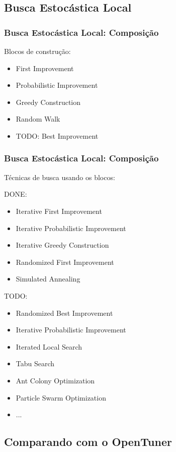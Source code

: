 \documentclass[10pt, compress]{beamer}
\begin{document}
\subsection{Busca Estocástica Local}

\begin{frame}[fragile]
    \frametitle{Busca Estocástica Local: Composição}
    Blocos de construção:
    \begin{itemize}
        \item First Improvement
        \item Probabilistic Improvement
        \item Greedy Construction
        \item Random Walk
            \pause
        \item \alert{TODO}: Best Improvement
    \end{itemize}
\end{frame}

\begin{frame}[fragile]
    \frametitle{Busca Estocástica Local: Composição}
    Técnicas de busca usando os blocos:

    \alert{DONE}:
    \begin{itemize}
        \item Iterative First Improvement
        \item Iterative Probabilistic Improvement
        \item Iterative Greedy Construction
        \item Randomized First Improvement
        \item Simulated Annealing
    \end{itemize}
    \pause

    \alert{TODO}:
    \begin{itemize}
        \item Randomized Best Improvement
        \item Iterative Probabilistic Improvement
        \item Iterated Local Search
        \item Tabu Search
        \item Ant Colony Optimization
        \item Particle Swarm Optimization
        \item ...
    \end{itemize}
\end{frame}

\subsection{Comparando com o OpenTuner}
\end{document}
